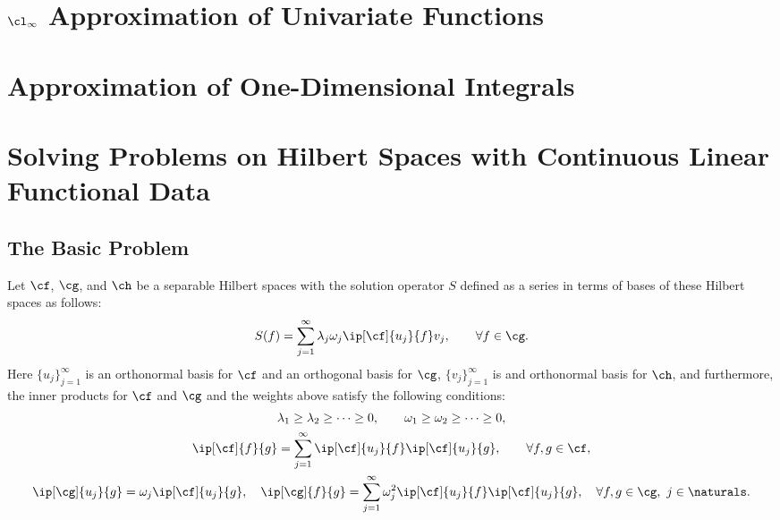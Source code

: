 \documentclass[final]{elsarticle}
\theoremstyle{definition}
\theoremstyle{remark}
\begin{document}
\section{$\cl_{\infty}$ Approximation of Univariate Functions} \label{approxsec}



\section{Approximation of One-Dimensional Integrals} \label{integsec}




\section{Solving Problems on Hilbert Spaces with Continuous Linear Functional Data}
\subsection{The Basic Problem}
Let $\cf$, $\cg$, and $\ch$ be a separable Hilbert spaces with the solution operator $S$ defined as a series in terms of bases of these Hilbert spaces as follows:
\begin{equation} \label{HilbertS}
S(f) = \sum_{j=1}^\infty \lambda_j \omega_j \ip[\cf]{u_j}{f} v_j, \qquad \forall f \in \cg.
\end{equation}
Here $\{u_j\}_{j=1}^{\infty}$ is an orthonormal basis for $\cf$ and an orthogonal basis for $\cg$, $\{v_j\}_{j=1}^{\infty}$ is and orthonormal basis for $\ch$, and furthermore, the inner products for $\cf$ and $\cg$ and the weights above satisfy the following conditions:
\begin{gather*}
\lambda_1 \ge \lambda_2 \ge \cdots \ge 0, \qquad \omega_1 \ge \omega_2 \ge \cdots \ge 0, \\
\ip[\cf]{f}{g} = \sum_{j=1}^\infty \ip[\cf]{u_j}{f} \ip[\cf]{u_j}{g}, \qquad \forall f,g \in \cf, \\
\ip[\cg]{u_j}{g}= \omega_j\ip[\cf]{u_j}{g}, \quad \ip[\cg]{f}{g} = \sum_{j=1}^\infty \omega_j^2\ip[\cf]{u_j}{f} \ip[\cf]{u_j}{g}, \quad \forall f,g \in \cg, \ j \in \naturals.
\end{gather*}
\end{document}
